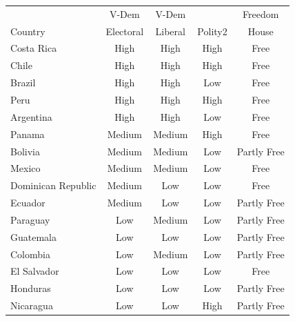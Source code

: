 \begin{tabular}{lcccc}
\toprule
 & V-Dem & V-Dem & & Freedom \\
Country & Electoral & Liberal & Polity2 & House \\
\midrule
Costa Rica & High & High & High & Free \\
Chile & High & High & High & Free \\
Brazil & High & High & Low & Free \\
Peru & High & High & High & Free \\
Argentina & High & High & Low & Free \\
Panama & Medium & Medium & High & Free \\
Bolivia & Medium & Medium & Low & Partly Free \\
Mexico & Medium & Medium & Low & Free \\
Dominican Republic & Medium & Low & Low & Free \\
Ecuador & Medium & Low & Low & Partly Free \\
Paraguay & Low & Medium & Low & Partly Free \\
Guatemala & Low & Low & Low & Partly Free \\
Colombia & Low & Medium & Low & Partly Free \\
El Salvador & Low & Low & Low & Free \\
Honduras & Low & Low & Low & Partly Free \\
Nicaragua & Low & Low & High & Partly Free \\
\bottomrule
\end{tabular}
